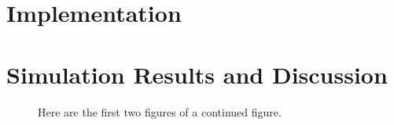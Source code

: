 \def\CTeXPreproc{Created by ctex v0.2.14, don't edit!}\documentclass[11pt]{article}
\begin{document}
\section{Implementation}

\section{Simulation Results and Discussion}

\begin{figure}
    \centering
    \qquad
    \caption{Here are the first two figures of a continued figure.}
    \label{fig:cont}
\end{figure}
\end{document}

